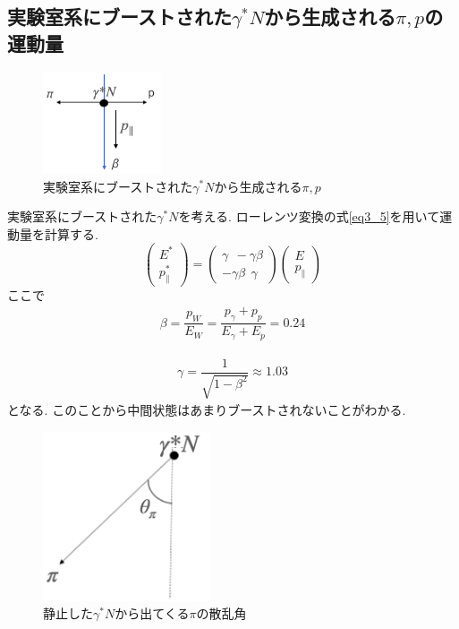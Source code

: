\subsection{実験室系にブーストされた$\gamma^* N$から生成される$\pi,p$の運動量}
\begin{figure}[H]
    \centering
    \includegraphics[height=3cm]{img/boost_middle_situation.png}
    \caption{実験室系にブーストされた$\gamma^* N$から生成される$\pi,p$}
    \label{fig:angle6}
\end{figure}
実験室系にブーストされた$\gamma^* N$を考える.
ローレンツ変換の式\ref{eq3_5}を用いて運動量を計算する.
\begin{equation}
    \label{eq3_5}
    \left(\begin{array}{c}
            E^* \\
            p^*_\parallel
        \end{array}\right)
    =\left(\begin{array}{cc}
            \gamma \ \ -\gamma \beta \\
            -\gamma \beta  \ \  \gamma
        \end{array}\right)
    \left(\begin{array}{c}
            E \\
            p_\parallel
        \end{array}\right)
\end{equation}
ここで
\begin{eqnarray}
    \beta = \dfrac{p_W}{E_W} = \dfrac{p_\gamma + p_p}{E_\gamma + E_p} = 0.24
\end{eqnarray}

\begin{eqnarray}
    \gamma = \dfrac{1}{\sqrt{1 - \beta^2}} \approx 1.03
\end{eqnarray}
となる.
このことから中間状態はあまりブーストされないことがわかる.

\begin{figure}[H]
    \centering
    \includegraphics[height=5cm]{img/theta_pi.png}
    \caption{静止した$\gamma^* N$から出てくる$\pi$の散乱角}
    \label{fig:angle7}
\end{figure}

